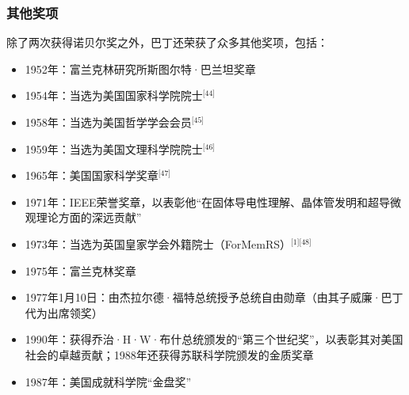 \subsubsection{其他奖项}
除了两次获得诺贝尔奖之外，巴丁还荣获了众多其他奖项，包括：
\begin{itemize}
\item 1952年：富兰克林研究所斯图尔特·巴兰坦奖章
\item 1954年：当选为美国国家科学院院士\(^\text{[44]}\)
\item 1958年：当选为美国哲学学会会员\(^\text{[45]}\)
\item 1959年：当选为美国文理科学院院士\(^\text{[46]}\)
\item 1965年：美国国家科学奖章\(^\text{[47]}\)
\item 1971年：IEEE荣誉奖章，以表彰他“在固体导电性理解、晶体管发明和超导微观理论方面的深远贡献”
\item 1973年：当选为英国皇家学会外籍院士（ForMemRS）\(^\text{[1][48]}\)
\item 1975年：富兰克林奖章
\item 1977年1月10日：由杰拉尔德·福特总统授予总统自由勋章（由其子威廉·巴丁代为出席领奖）
\item 1990年：获得乔治·H·W·布什总统颁发的“第三个世纪奖”，以表彰其对美国社会的卓越贡献；1988年还获得苏联科学院颁发的金质奖章
\item 1987年：美国成就科学院“金盘奖”
\end{itemize}